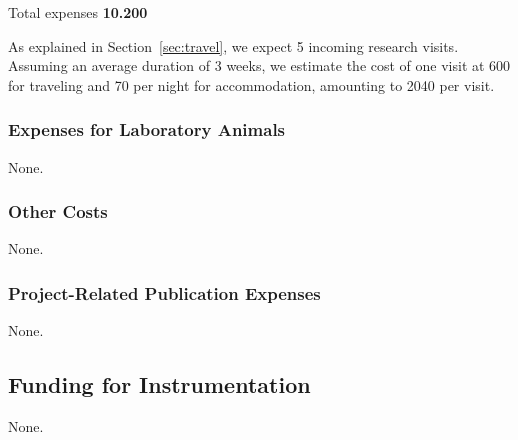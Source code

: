 Total expenses \textbf{10.200 \texteuro}
\medskip

As explained in Section~\ref{sec:travel}, we expect 5 incoming research visits.  Assuming
an average duration of 3 weeks, we estimate the cost of one visit at 600 {\texteuro} for
traveling and 70 {\texteuro} per night for accommodation, amounting to 2040 \texteuro per
visit.

\subsubsection{Expenses for Laboratory Animals} None.

\subsubsection{Other Costs} None.

\subsubsection{Project-Related Publication Expenses} None.

\subsection{Funding for Instrumentation} None.


